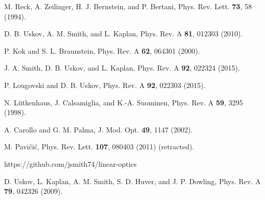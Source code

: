 \documentclass[aps,pra,twocolumn,superscriptaddress,floatfix,10pt]{revtex4}
\begin{document}
\begin{thebibliography}{99}
 M. Reck, A. Zeilinger, H. J. Bernstein, and P. Bertani, Phys. Rev. Lett. {\bf 73}, 58 (1994).

 D. B. Uskov, A. M. Smith, and L. Kaplan,
Phys. Rev. A {\bf 81}, 012303 (2010).

 P. Kok and S. L. Braunstein, Phys. Rev. A {\bf 62}, 064301 (2000).

 J. A. Smith, D. B. Uskov, and L. Kaplan, Phys. Rev. A {\bf 92}, 022324 (2015).

 P. Lougovski and D. B. Uskov, Phys. Rev. A {\bf 92}, 022303 (2015).

 N. L\"utkenhaus, J. Calsamiglia, and K.-A. Suominen, Phys. Rev. A {\bf 59}, 3295 (1998).

 A. Carollo and G. M. Palma, J. Mod. Opt. {\bf 49}, 1147 (2002).

 M. Pavi\v{c}i\'c, Phys. Rev. Lett. {\bf 107}, 080403 (2011) (retracted).

 https://github.com/jsmith74/linear-optics

 D. Uskov, L. Kaplan, A. M. Smith, S. D. Huver, and J. P. Dowling, Phys. Rev. A {\bf 79}, 042326 (2009).


\end{thebibliography}
\end{document}
